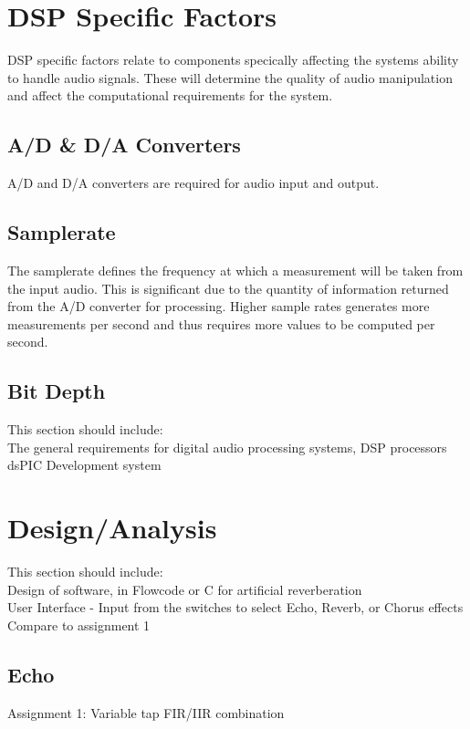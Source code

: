 \documentclass{scrartcl}
\begin{document}
    \section{DSP Specific Factors}
    DSP specific factors relate to components specically affecting the systems
    ability to handle audio signals. These will determine the quality of audio
    manipulation and affect the computational requirements for the system.

    \subsection{A/D \& D/A Converters}
    A/D and D/A converters are required for audio input and output. 
    
    \subsection{Samplerate}
    The samplerate defines the frequency at which a measurement will be taken
    from the input audio. This is significant due to the quantity of
    information returned from the A/D converter for processing. Higher sample
    rates generates more measurements per second and thus requires more values
    to be computed per second.

    \subsection{Bit Depth}

    This section should include:\\
        The general requirements for digital audio processing systems, DSP
        processors\\
        dsPIC Development system\\

    \section{Design/Analysis}
    This section should include:\\
        Design of software, in Flowcode or C for artificial reverberation\\
        User Interface - Input from the switches to select Echo, Reverb, or
        Chorus effects\\

        Compare to assignment 1\\
        \subsection{Echo}
        Assignment 1: Variable tap FIR/IIR combination
\end{document}
